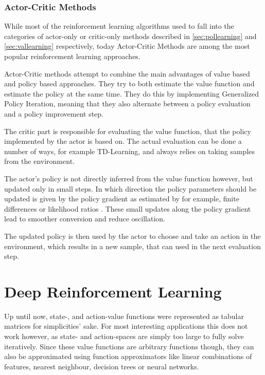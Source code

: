 \subsubsection{Actor-Critic Methods}
\label{sec:accritic}
While most of the reinforcement learning algorithms used to fall into the categories of actor-only or critic-only methods described in \ref{sec:pollearning} and \ref{sec:vallearning} respectively, today Actor-Critic Methods are among the most popular reinforcement learning approaches.

Actor-Critic methods attempt to combine the main advantages of value based and policy based approaches. They try to both estimate the value function and estimate the policy at the same time.
They do this by implementing Generalized Policy Iteration, meaning that they also alternate between a policy evaluation and a policy improvement step.

The critic part is responsible for evaluating the value function, that the policy implemented by the actor is based on. The actual evaluation can be done a number of ways, for example TD-Learning, and always relies on taking samples from the environment.

The actor's policy is not directly inferred from the value function however, but updated only in small steps. In which direction the policy parameters should be updated is given by the policy gradient as estimated by for example, finite differences \citep{DBLP:journals/technometrics/Hesterberg04} or likelihood ratios \citep{DBLP:journals/cacm/Glynn90}. These small updates along the policy gradient lead to smoother conversion and reduce oscillation. 

The updated policy is then used by the actor to choose and take an action in the environment, which 
results in a new sample, that can used in the next evaluation step.

\section{Deep Reinforcement Learning}
\label{sec:deeprl}
Up until now, state-, and action-value functions were represented as tabular matrices for simplicities' sake. For most interesting applications this does not work however, as state- and action-spaces are simply too large to fully solve iteratively. Since these value functions are arbitrary functions though, they can also be approximated using function approximators like linear combinations of features, nearest neighbour, decision trees or neural networks. 

